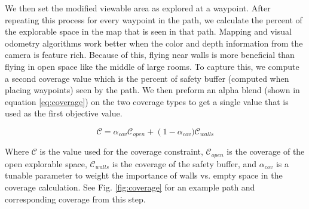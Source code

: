 \documentclass[letterpaper, 10 pt, conference]{ieeeconf}  %
\begin{document}
We then set the modified viewable area as explored at a waypoint. After repeating this process for every waypoint in the path, we calculate the percent of the explorable space in the map that is seen in that path. Mapping and visual odometry algorithms work better when the color and depth information from the camera is feature rich. Because of this, flying near walls is more beneficial than flying in open space like the middle of large rooms. To capture this, we compute a second coverage value which is the percent of safety buffer (computed when placing waypoints) seen by the path. We then preform an alpha blend (shown in equation \ref{eq:coverage}) on the two coverage types to get a single value that is used as the first objective value.

\begin{equation}\label{eq:coverage}%
    \mathcal{C} = \alpha_{cov} \mathcal{C}_{open} + \left(1-\alpha_{cov})\right. \mathcal{C}_{walls}
\end{equation}

Where $\mathcal{C}$ is the value used for the coverage constraint, $\mathcal{C}_{open}$ is the coverage of the open explorable space, $\mathcal{C}_{walls}$ is the coverage of the safety buffer, and $\alpha_{cov}$ is a tunable parameter to weight the importance of walls vs. empty space in the coverage calculation. See Fig. \ref{fig:coverage} for an example path and corresponding coverage from this step.
\end{document}

